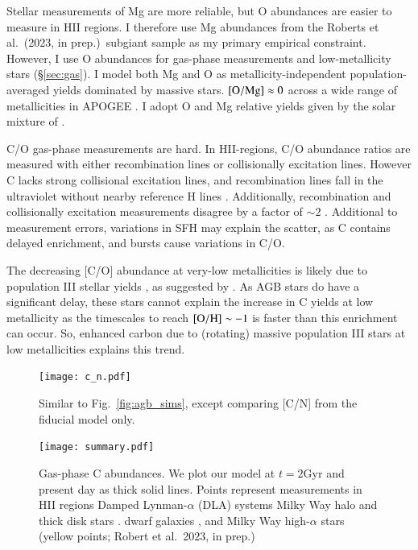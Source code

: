 \documentclass[12pt,oneside]{report}
\newcommand{\citetjack}{Roberts et al.~(2023, in prep.)}
\newcommand{\citealtjack}{Robert et al.~2023, in prep.}
\newcommand{\about}[1]{${\sim} #1$}
\begin{document}
Stellar measurements of Mg are more reliable, but O abundances are easier to measure in HII regions.  I therefore use Mg abundances from the \citetjack~subgiant sample as my primary empirical constraint. However, I use O abundances for gas-phase measurements and low-metallicity stars (\S \ref{sec:gas}). I model both Mg and O as metallicity-independent population-averaged yields dominated by massive stars. ${\rm [O/Mg]}\approx 0$ across a wide range of metallicities in APOGEE \citep{weinberg+19, weinberg+22}. 
I adopt O and Mg relative yields given by the solar mixture of \cite{asplund+09}.

C/O gas-phase measurements are hard. In HII-regions, C/O abundance ratios are measured with either recombination lines or collisionally excitation lines. However C lacks strong collisional excitation lines, and recombination lines fall in the ultraviolet without nearby reference H lines \citep{skillman+20}. Additionally, recombination and collisionally excitation measurements disagree by a factor of \about{2} \cite{GR07}.
Additional to measurement errors, variations in SFH may explain the scatter, as C contains delayed enrichment, and bursts cause variations in C/O. 

The decreasing [C/O] abundance at very-low metallicities is likely due to population III stellar yields \citep[e.g.][]{hirschi07}, as suggested by \citep{cooke+17, FN15}.
As AGB stars do have a significant delay, these stars cannot explain the increase in C yields at low metallicity as the timescales to reach $\rm [O/H]\sim -1$ is faster than this enrichment can occur. So, enhanced carbon due to (rotating) massive population III stars at low metallicities explains this trend.

\begin{figure}
    \texttt{[image: c\_n.pdf]}
    \caption[C/N abundance agreement]{Similar to Fig.~\ref{fig:agb_sims}, except comparing [C/N] from the fiducial model only.
    }
\end{figure}

\begin{figure}
\centering
\texttt{[image: summary.pdf]}
\caption[Gas phase abundances]{Gas-phase C abundances. We plot our model at $t=2$Gyr and present day as thick solid lines. Points represent measurements in 
    HII regions    \citep[pink circles;][]{skillman+20, esteban+02, esteban+09, esteban+14, esteban+19}
    Damped Lynman-$\alpha$ (DLA) systems \citep[blue triangles;][]{cooke+17} 
    Milky Way halo and thick disk stars \citep[green stars;][]{nissen+14, fabbian+09}. 
    dwarf galaxies \citep[red diamonds;]{berg+19},
    and Milky Way high-$\alpha$ stars (yellow points; \citealtjack)
}
\label{fig:gas_phase}
\end{figure}
\end{document}
